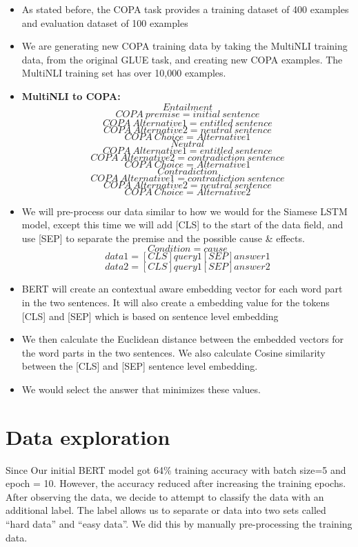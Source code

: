 \documentclass{article}
\begin{document}
\begin{itemize}

    \item As stated before, the COPA task provides a training dataset of 400 examples and evaluation dataset of 100 examples
    
    \item We are generating new COPA training data by taking the MultiNLI training data, from the original GLUE task, and creating new COPA examples.  The MultiNLI training set has over 10,000 examples.
    \item \textbf{MultiNLI to COPA:}
    $$Entailment$$
    $$COPA \ premise = initial \ sentence$$
    $$ COPA \ Alternative1 = entitled \ sentence $$
    $$ COPA \ Alternative2 = neutral \ sentence $$
    $$   COPA \ Choice = Alternative1 $$
    $$Neutral$$
    $$ COPA \ Alternative1 = entitled \ sentence $$
    $$ COPA \ Alternative2 = contradiction \ sentence $$
    $$   COPA \ Choice = Alternative1 $$
    $$Contradiction$$
    $$ COPA \ Alternative1 = contradiction \ sentence $$
    $$ COPA \ Alternative2 = neutral \ sentence $$
    $$   COPA \ Choice = Alternative2 $$
    
    \item We will pre-process our data similar to how we would for the Siamese LSTM model, except this time we will add [CLS] to the start of the data field, and use [SEP] to separate the premise and the possible cause & effects. \\ 
    $$Condition = cause$$
    $$data1 = [CLS]query1 [SEP] answer1$$
    $$data2 = [CLS]query1 [SEP] answer 2$$

    \item BERT will create an contextual aware embedding vector for each word part in the two sentences.  It will also create a embedding value for the tokens [CLS] and [SEP] which is based on sentence level embedding
    \item We then calculate the Euclidean distance between the embedded vectors for the word parts in the two sentences.  We also calculate Cosine similarity between the [CLS] and [SEP] sentence level embedding.
    \item We would select the answer that minimizes these values.
\end{itemize}
\section{Data exploration}
Since Our initial BERT model got 64\% training accuracy with batch size=5 and epoch = 10. However, the accuracy reduced after increasing the training epochs. After observing the data, we decide to attempt to classify the data with an additional label.  The label allows us to separate or data into two sets called “hard data” and “easy data”.  We did this by manually pre-processing the training data.
\end{document}
